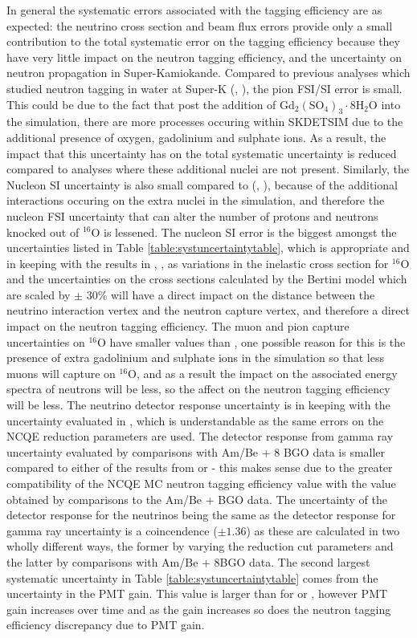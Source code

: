 In general the systematic errors associated with the tagging efficiency are as expected: the neutrino cross section and beam flux errors provide only a small contribution to the total systematic error on the tagging efficiency because they have very little impact on the neutron tagging efficiency, and the uncertainty on neutron propagation in Super-Kamiokande. Compared to previous analyses which studied neutron tagging in water at Super-K (\cite{tn415_fiacob}, \cite{akutsu_thesis}), the pion FSI/SI error is small. This could be due to the fact that post the addition of $\mathrm{Gd}_{2}\left(\mathrm{SO}_{4}\right)_{3} \cdot 8 \mathrm{H}_{2} \mathrm{O}$ into the simulation, there are more processes occuring within SKDETSIM due to the additional presence of oxygen, gadolinium and sulphate ions. As a result, the impact that this uncertainty has on the total systematic uncertainty is reduced compared to analyses where these additional nuclei are not present. Similarly, the Nucleon SI uncertainty is also small compared to (\cite{tn415_fiacob}, \cite{akutsu_thesis}), because of the additional interactions occuring on the extra nuclei in the simulation, and therefore the nucleon FSI uncertainty that can alter the number of protons and neutrons knocked out of ${ }^{16} \mathrm{O}$ is lessened. The nucleon SI error is the biggest amongst the uncertainties listed in Table \ref{table:systuncertaintytable}, which is appropriate and in keeping with the results in \cite{tn415_fiacob}, \cite{akutsu_thesis}, as variations in the inelastic cross section for ${ }^{16} \mathrm{O}$ and the uncertainties on the cross sections calculated by the Bertini model which are scaled by $\pm$ 30\% will have a direct impact on the distance between the neutrino interaction vertex and the neutron capture vertex, and therefore a direct impact on the neutron tagging efficiency. The muon and pion capture uncertainties on ${ }^{16} \mathrm{O}$ have smaller values than \cite{akutsu_thesis}, one possible reason for this is the presence of extra gadolinium and sulphate ions in the simulation so that less muons will capture on ${ }^{16} \mathrm{O}$, and as a result the impact on the associated energy spectra of neutrons will be less, so the affect on the neutron tagging efficiency will be less. The neutrino detector response uncertainty is in keeping with the uncertainty evaluated in \cite{tn415_fiacob}, which is understandable as the same errors on the NCQE reduction parameters are used. The detector response from gamma ray uncertainty evaluated by comparisons with Am/Be + 8 BGO data is smaller compared to either of the results from \cite{tn415_fiacob} or \cite{akutsu_thesis} - this makes sense due to the greater compatibility of the NCQE MC neutron tagging efficiency value with the value obtained by comparisons to the Am/Be + BGO data. The uncertainty of the detector response for the neutrinos being the same as the detector response for gamma ray uncertainty is a coincendence ($\pm 1.36$) as these are calculated in two wholly different ways, the former by varying the reduction cut parameters and the latter by comparisons with Am/Be + 8BGO data. The second largest systematic uncertainty in Table \ref{table:systuncertaintytable} comes from the uncertainty in the PMT gain. This value is larger than for \cite{tn415_fiacob} or \cite{akutsu_thesis}, however PMT gain increases over time and as the gain increases so does the neutron tagging efficiency discrepancy due to PMT gain.